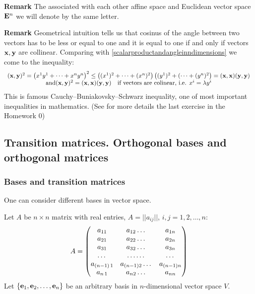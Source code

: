 \documentclass[12pt]{article}
\numberwithin{equation}{section}
\begin{document}
{\bf Remark}  The associated with each other affine space and
Euclidean vector space ${\bf E}^n$ we will denote by the same letter. 



{\footnotesize {\bf Remark} Geometrical intuition  
tells us that cosinus of the angle between 
two vectors has to be
 less or equal to one and it is equal to 
one if and only if vectors ${\bf x},{\bf y}$ are collinear.
 Comparing with \eqref{scalarproductandangleinndimensions} 
we come to the inequality:
                  \begin{equation}\label{cauchybuniakovsky}
                  \begin{array}{cc}
            ({\bf x},{\bf y})^2=\left(x^1y^1+\dots+x^ny^n\right)^2\leq \left((x^1)^2+\dots+(x^n)^2\right)
             \left((y^1)^2+(\dots+(y^n)^2\right)=({\bf x},{\bf x})({\bf y},{\bf y})\\
           {\rm and} ({\bf x},{\bf y})^2=({\bf x},{\bf x})({\bf y},{\bf y})\quad \hbox 
{if vectors are colinear, i.e. $x^i=\lambda y^i$}
             \end{array}
                  \end{equation}
This is famous Cauchy--Buniakovsky--Schwarz inequality, 
one of most
important inequalities in mathematics. (See for more details
the last exercise in the Homework 0)}


\subsection {Transition matrices. 
Orthogonal bases and orthogonal matrices}

\subsubsection {Bases and transition matrices}


One can consider different  bases in vector space.

Let $A$ be $n\times n$ matrix with real entries, $A=||a_{ij}||$, $i,j=1,2,\dots,n$:
             $$
          A=\begin{pmatrix}
   a_{11} &a_{12}\dots &a_{1n}\cr
   a_{21} &a_{22}\dots &a_{2n}\cr
 a_{31} &a_{32}\dots &a_{3n}\cr
 \dots &\dots\dots &\dots\cr
 a_{(n-1)\, 1} &a_{(n-1) 2}\dots &a_{(n-1)n}\cr
 a_{n\,1} &a_{n 2}\dots &a_{n n}\cr
\end{pmatrix}
                $$
Let $\{{\bf e}_1,{\bf e}_2,\dots,{\bf e}_n\}$ be an arbitrary  basis in $n$-dimensional vector space $V$.
\end{document}
